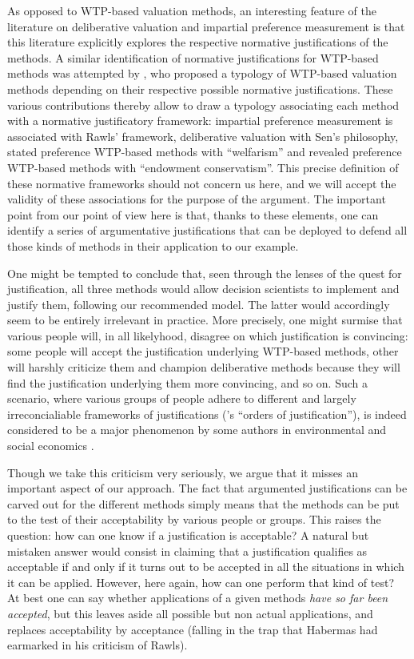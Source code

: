 \documentclass[preprint,11pt]{elsarticle}
\begin{document}
As opposed to WTP-based valuation methods, an interesting feature of the literature on deliberative valuation and impartial preference measurement is that this literature explicitly explores the respective normative justifications of the methods. A similar identification of normative justifications for WTP-based methods was attempted by \citep{meinard_ethical_2016}, who proposed a typology of WTP-based valuation methods depending on their respective possible normative justifications. These various contributions thereby allow to draw a typology associating each method with a normative justificatory framework: impartial preference measurement is associated with Rawls' framework, deliberative valuation with Sen's philosophy, stated preference WTP-based methods with ``welfarism'' and revealed preference WTP-based methods with ``endowment conservatism''. This precise definition of these normative frameworks should not concern us here, and we will accept the validity of these associations for the purpose of the argument. The important point from our point of view here is that, thanks to these elements, one can identify a series of argumentative justifications that can be deployed to defend all those kinds of methods in their application to our example.

One might be tempted to conclude that, seen through the lenses of the quest for justification, all three methods would allow decision scientists to implement and justify them, following our recommended model. The latter would accordingly seem to be entirely irrelevant in practice. More precisely, one might surmise that various people will, in all likelyhood, disagree on which justification is convincing: some people will accept the justification underlying WTP-based methods, other will harshly criticize them and champion deliberative methods because they will find the justification underlying them more convincing, and so on. Such a scenario, where various groups of people adhere to different and largely irreconcialiable frameworks of justifications (\citep{boltanski_justification_2006}'s ``orders of justification''), is indeed considered to be a major phenomenon by some authors in environmental and social economics \citep{chateauraynaud_contrainte_2007}.

Though we take this criticism very seriously, we argue that it misses an important aspect of our approach. The fact that argumented justifications can be carved out for the different methods simply means that the methods can be put to the test of their acceptability by various people or groups. This raises the question: how can one know if a justification is acceptable? A natural but mistaken answer would consist in claiming that a justification qualifies as acceptable if and only if it turns out to be accepted in all the situations in which it can be applied. However, here again, how can one perform that kind of test? At best one can say whether applications of a given methods \emph{have so far been accepted}, but this leaves aside all possible but non actual applications, and replaces acceptability by acceptance (falling in the trap that Habermas had earmarked in his criticism of Rawls).
\end{document}

